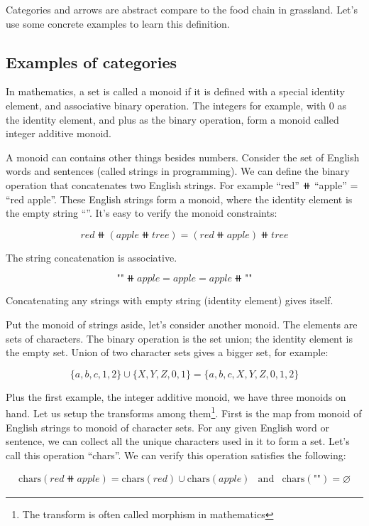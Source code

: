 \documentclass{article}
\begin{document}
Categories and arrows are abstract compare to the food chain in grassland. Let's use some concrete examples to learn this definition.

\subsection{Examples of categories}

In mathematics, a set is called a monoid if it is defined with a special identity element, and associative binary operation. The integers for example, with 0 as the identity element, and plus as the binary operation, form a monoid called integer additive monoid.

A monoid can contains other things besides numbers. Consider the set of English words and sentences (called strings in programming). We can define the binary operation that concatenates two English strings. For example ``red'' $\doubleplus$ ``apple'' = ``red apple''. These English strings form a monoid, where the identity element is the empty string ``''. It's easy to verify the monoid constraints:

\[
red \doubleplus (apple \doubleplus tree) = (red \doubleplus apple) \doubleplus tree
\]

The string concatenation is associative.

\[
\texttt{""} \doubleplus apple = apple = apple \doubleplus \texttt{""}
\]

Concatenating any strings with empty string (identity element) gives itself.

Put the monoid of strings aside, let's consider another monoid. The elements are sets of characters. The binary operation is the set union; the identity element is the empty set. Union of two character sets gives a bigger set, for example:

\[
\{a, b, c, 1, 2\} \cup \{X, Y, Z, 0, 1\} = \{a, b, c, X, Y, Z, 0, 1, 2\}
\]

Plus the first example, the integer additive monoid, we have three monoids on hand. Let us setup the transforms among them\footnote{The transform is often called morphism in mathematics}. First is the map from monoid of English strings to monoid of character sets. For any given English word or sentence, we can collect all the unique characters used in it to form a set. Let's call this operation ``chars''. We can verify this operation satisfies the following:

\[
\begin{array}{rcl}
\text{chars}(red \doubleplus apple) = \text{chars}(red) \cup \text{chars}(apple) & \text{and} & \text{chars}(\texttt{""}) = \varnothing
\end{array}
\]
\end{document}
